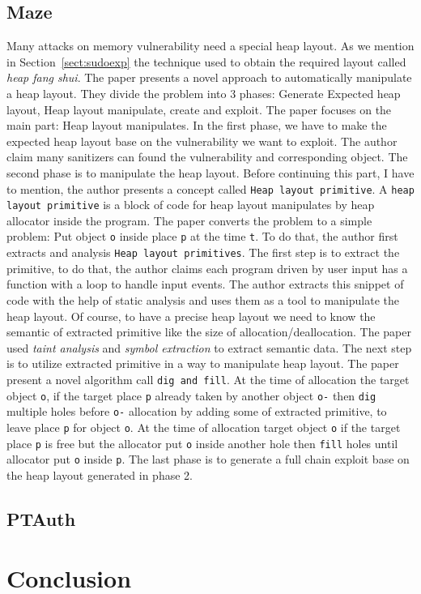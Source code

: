 \documentclass{masterthesis}
\newcommand{\refToSection}[1]{Section~\ref{sect:#1}\xspace}
\begin{document}
\section{Maze}
\label{sect:maze}
Many attacks on memory vulnerability need a special heap layout. As we mention in \refToSection{sudoexp} the technique used to obtain the required layout called \emph{heap fang shui}. The paper presents a novel approach to automatically manipulate a heap layout. They divide the problem into 3 phases: Generate Expected heap layout, Heap layout manipulate, create and exploit. The paper focuses on the main part: Heap layout manipulates. In the first phase, we have to make the expected heap layout base on the vulnerability we want to exploit. The author claim many sanitizers can found the vulnerability and corresponding object. The second phase is to manipulate the heap layout. Before continuing this part, I have to mention, the author presents a concept called \lstinline{Heap layout primitive}. A \lstinline{heap layout primitive} is a block of code for heap layout manipulates by heap allocator inside the program. The paper converts the problem to a simple problem: Put object \lstinline{o} inside place \lstinline{p} at the time \lstinline{t}. To do that, the author first extracts and analysis \lstinline{Heap layout primitives}. The first step is to extract the primitive, to do that, the author claims each program driven by user input has a function with a loop to handle input events. The author extracts this snippet of code with the help of static analysis and uses them as a tool to manipulate the heap layout. Of course, to have a precise heap layout we need to know the semantic of extracted primitive like the size of allocation/deallocation. The paper used \emph{taint analysis} and \emph{symbol extraction} to extract semantic data. The next step is to utilize extracted primitive in a way to manipulate heap layout. The paper present a novel algorithm call \lstinline{dig and fill}. At the time of allocation the target object \lstinline{o}, if the target place \lstinline{p} already taken by another object \lstinline{o-} then \lstinline{dig} multiple holes before \lstinline{o-} allocation by adding some of extracted primitive, to leave place \lstinline{p} for object \lstinline{o}. At the time of allocation target object \lstinline{o} if the target place \lstinline{p} is free but the allocator put \lstinline{o} inside another hole then \lstinline{fill} holes until allocator put \lstinline{o} inside \lstinline{p}. The last phase is to generate a full chain exploit base on the heap layout generated in phase 2.
\section{PTAuth}
\label{sect:ptauth}
\chapter{Conclusion}

% 
% 
\end{document}
